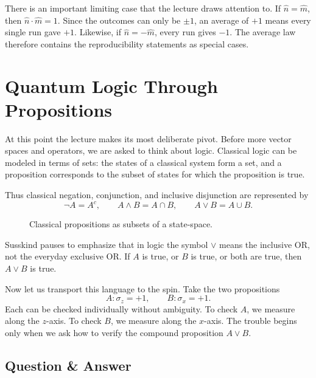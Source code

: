 There is an important limiting case that the lecture draws attention to. If \(\hat n=\hat m\), then \(\hat n\cdot\hat m=1\). Since the outcomes can only be \(\pm1\), an average of \(+1\) means every single run gave \(+1\). Likewise, if \(\hat n=-\hat m\), every run gives \(-1\). The average law therefore contains the reproducibility statements as special cases.

\section{Quantum Logic Through Propositions}

At this point the lecture makes its most deliberate pivot. Before more vector spaces and operators, we are asked to think about logic. Classical logic can be modeled in terms of sets: the states of a classical system form a set, and a proposition corresponds to the subset of states for which the proposition is true.

Thus classical negation, conjunction, and inclusive disjunction are represented by
\begin{equation}
\neg A=A^c,\qquad
A\land B=A\cap B,\qquad
A\lor B=A\cup B.
\end{equation}

\begin{figure}
\centering
{}
\caption{Classical propositions as subsets of a state-space.}
\end{figure}

Susskind pauses to emphasize that in logic the symbol \(\lor\) means the inclusive OR, not the everyday exclusive OR. If \(A\) is true, or \(B\) is true, or both are true, then \(A\lor B\) is true.

Now let us transport this language to the spin. Take the two propositions
\begin{equation}
A:\sigma_z=+1,\qquad B:\sigma_x=+1.
\end{equation}
Each can be checked individually without ambiguity. To check \(A\), we measure along the \(z\)-axis. To check \(B\), we measure along the \(x\)-axis. The trouble begins only when we ask how to verify the compound proposition \(A\lor B\).

\subsection{Question \& Answer}


